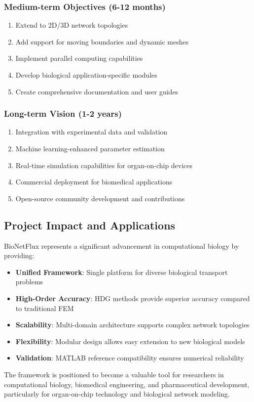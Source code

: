 \subsubsection{Medium-term Objectives (6-12 months)}
\begin{enumerate}
    \item Extend to 2D/3D network topologies
    \item Add support for moving boundaries and dynamic meshes
    \item Implement parallel computing capabilities
    \item Develop biological application-specific modules
    \item Create comprehensive documentation and user guides
\end{enumerate}

\subsubsection{Long-term Vision (1-2 years)}
\begin{enumerate}
    \item Integration with experimental data and validation
    \item Machine learning-enhanced parameter estimation
    \item Real-time simulation capabilities for organ-on-chip devices
    \item Commercial deployment for biomedical applications
    \item Open-source community development and contributions
\end{enumerate}

\subsection{Project Impact and Applications}

BioNetFlux represents a significant advancement in computational biology by providing:

\begin{itemize}
    \item \textbf{Unified Framework}: Single platform for diverse biological transport problems
    \item \textbf{High-Order Accuracy}: HDG methods provide superior accuracy compared to traditional FEM
    \item \textbf{Scalability}: Multi-domain architecture supports complex network topologies
    \item \textbf{Flexibility}: Modular design allows easy extension to new biological models
    \item \textbf{Validation}: MATLAB reference compatibility ensures numerical reliability
\end{itemize}

The framework is positioned to become a valuable tool for researchers in computational biology, biomedical engineering, and pharmaceutical development, particularly for organ-on-chip technology and biological network modeling.

